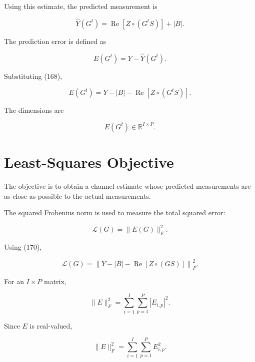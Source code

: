 \documentclass[12pt,a4paper]{article}
\begin{document}
Using this estimate, the predicted measurement is

\begin{equation}
\boxed{
\widehat{Y}(G^t)
=
\operatorname{Re}
[Z\circ(G^tS)]
+
|B|
}.
\tag{168}
\end{equation}

The prediction error is defined as

\begin{equation}
\boxed{
E(G^t)
=
Y-\widehat{Y}(G^t)
}.
\tag{169}
\end{equation}

Substituting (168),

\begin{equation}
\boxed{
E(G^t)
=
Y-|B|
-
\operatorname{Re}
[Z\circ(G^tS)]
}.
\tag{170}
\end{equation}

The dimensions are

\begin{equation}
E(G^t)\in\mathbb{R}^{I\times P}.
\tag{171}
\end{equation}

\section{Least-Squares Objective}

The objective is to obtain a channel estimate whose predicted measurements are as close as possible to the actual measurements.

The squared Frobenius norm is used to measure the total squared error:

\begin{equation}
\boxed{
\mathcal{L}(G)
=
\|E(G)\|_F^2
}.
\tag{172}
\end{equation}

Using (170),

\begin{equation}
\boxed{
\mathcal{L}(G)
=
\left\|
Y-|B|
-
\operatorname{Re}
[Z\circ(GS)]
\right\|_F^2
}.
\tag{173}
\end{equation}

For an $I\times P$ matrix,

\begin{equation}
\|E\|_F^2
=
\sum_{i=1}^{I}
\sum_{p=1}^{P}
|E_{i,p}|^2.
\tag{174}
\end{equation}

Since $E$ is real-valued,

\begin{equation}
\|E\|_F^2
=
\sum_{i=1}^{I}
\sum_{p=1}^{P}
E_{i,p}^2.
\tag{175}
\end{equation}
\end{document}
